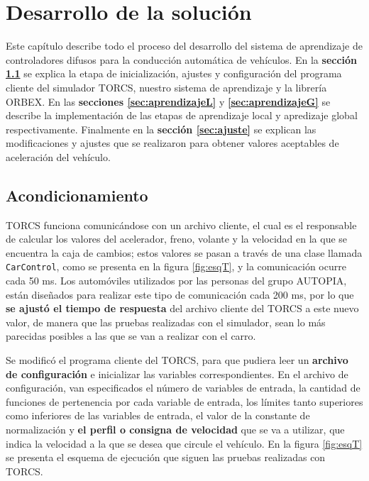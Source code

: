 \chapter{Desarrollo de la solución}
\label{chap:4_Desarrollo}

Este capítulo describe todo el proceso del desarrollo del sistema de aprendizaje de controladores difusos para la conducción automática de vehículos. %
En la \textbf{sección \ref{sec:acondicionamiento}} se explica la etapa de inicialización, ajustes y configuración del programa cliente del simulador \gls{TORCS}, nuestro sistema de aprendizaje y la librería \gls{ORBEX}. En las \textbf{secciones \ref{sec:aprendizajeL}} y \textbf{\ref{sec:aprendizajeG}} se describe la implementación de las etapas de aprendizaje local y apredizaje global respectivamente. Finalmente en la \textbf{sección \ref{sec:ajuste}} se explican las modificaciones y ajustes que se realizaron para obtener valores aceptables de aceleración del vehículo.

\section{Acondicionamiento}
\label{sec:acondicionamiento}


\gls{TORCS} funciona comunicándose con un archivo cliente, el cual es el responsable de calcular los valores del acelerador, freno, volante y la velocidad en la que se encuentra la caja de cambios; estos valores se pasan a través de una clase llamada {\tt CarControl}, como se presenta en la figura \ref{fig:esqT}, y la comunicación ocurre cada 50 ms. Los automóviles utilizados por las personas del grupo AUTOPIA, están diseñados para realizar este tipo de comunicación cada 200 ms, por lo que \textbf{se ajustó el tiempo de respuesta} del archivo cliente del \gls{TORCS} a este nuevo valor, de manera que las pruebas realizadas con el simulador, sean lo más parecidas posibles a las que se van a realizar con el carro.

Se modificó el programa cliente del \gls{TORCS}, para que pudiera leer un \textbf{archivo de configuración} e inicializar las variables correspondientes. En el archivo de configuración, van especificados el número de variables de entrada, la cantidad de funciones de pertenencia por cada variable de entrada, los límites tanto superiores como inferiores de las variables de entrada, el valor de la constante de normalización y \textbf{el perfil o consigna de velocidad} que se va a utilizar, que indica la velocidad a la que se desea que circule el vehículo. En la figura \ref{fig:esqT} se presenta el esquema de ejecución que siguen las pruebas realizadas con TORCS.

